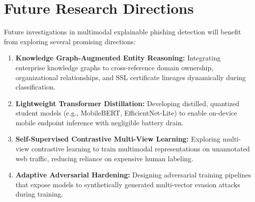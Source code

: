 \section{Future Research Directions}
Future investigations in multimodal explainable phishing detection will benefit from exploring several promising directions:
\begin{enumerate}
\item \textbf{Knowledge Graph-Augmented Entity Reasoning:} Integrating enterprise knowledge graphs to cross-reference domain ownership, organizational relationships, and SSL certificate lineages dynamically during classification.
\item \textbf{Lightweight Transformer Distillation:} Developing distilled, quantized student models (e.g., MobileBERT, EfficientNet-Lite) to enable on-device mobile endpoint inference with negligible battery drain.
\item \textbf{Self-Supervised Contrastive Multi-View Learning:} Exploring multi-view contrastive learning to train multimodal representations on unannotated web traffic, reducing reliance on expensive human labeling.
\item \textbf{Adaptive Adversarial Hardening:} Designing adversarial training pipelines that expose models to synthetically generated multi-vector evasion attacks during training.
\end{enumerate}
